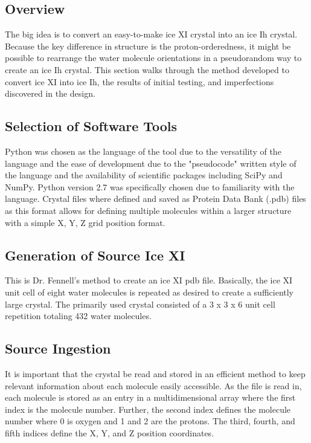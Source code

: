\subsection{Overview}

The big idea is to convert an easy-to-make ice XI crystal into an ice Ih crystal.
Because the key difference in structure is the proton-orderedness, it might be possible to rearrange the water molecule orientations in a pseudorandom way to create an ice Ih crystal.
This section walks through the method developed to convert ice XI into ice Ih, the results of initial testing, and imperfections discovered in the design.

\subsection{Selection of Software Tools}

Python was chosen as the language of the tool due to the versatility of the language and the ease of development due to the "pseudocode" written style of the language and the availability of scientific packages including SciPy and NumPy. 
Python version 2.7 was specifically chosen due to familiarity with the language.
Crystal files where defined and saved as Protein Data Bank (.pdb) files as this format allows for defining multiple molecules within a larger structure with a simple X, Y, Z grid position format. 

\subsection{Generation of Source Ice XI}

This is Dr. Fennell's method to create an ice XI pdb file. 
Basically, the ice XI unit cell of eight water molecules is repeated as desired to create a sufficiently large crystal.
The primarily used crystal consisted of a 3 x 3 x 6 unit cell repetition totaling 432 water molecules.

\subsection{Source Ingestion}

It is important that the crystal be read and stored in an efficient method to keep relevant information about each molecule easily accessible. 
As the file is read in, each molecule is stored as an entry in a multidimensional array where the first index is the molecule number. 
Further, the second index defines the molecule number where 0 is oxygen and 1 and 2 are the protons. 
The third, fourth, and fifth indices define the X, Y, and Z position coordinates. 

